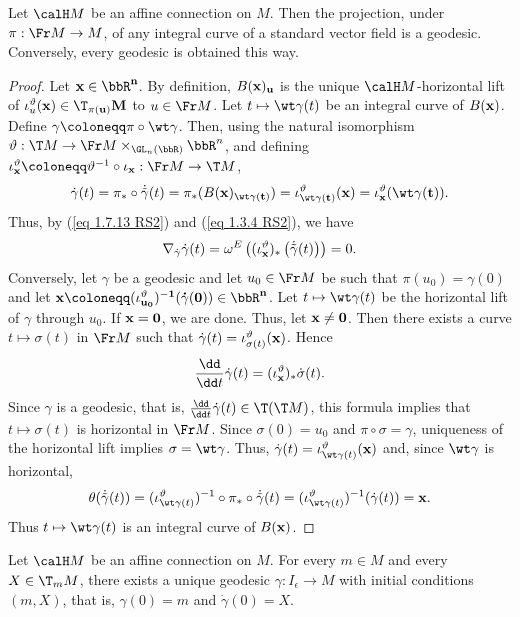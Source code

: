 \begin{prop}[{{\cite[Prop.~2.1.22]{RS2}}}]\label{prop 2.1.22 RS2}
    Let $\calH M$ be an affine connection on $M$. Then the projection, under $\pi:\Fr M\to M$, of any integral curve of a standard vector field is a geodesic. Conversely, every geodesic is obtained this way.
\end{prop}
\begin{proof}
    Let $\bf{x}\in\bbR^n$. By definition, $B(\bf{x})_u$ is the unique $\calH M$-horizontal lift of $\iota_u^\vartheta(\bf{x})\in \T_{\pi(u)}M$ to $u\in\Fr M$. Let $t\mapsto \wt\gamma(t)$ be an integral curve of $B(\bf{x})$. Define $\gamma\coloneqq \pi\circ\wt\gamma$. Then, using the natural isomorphism $\vartheta:\T M\to \Fr M\times_{\GL_n(\bbR)}\bbR^n$, and defining $\iota_{\bf{x}}^\vartheta\coloneqq \vartheta^{-1}\circ\iota_{\bf{x}}:\Fr M\to \T M$,
    \[\dot\gamma(t)=\pi_\ast\circ \dot{\tilde\gamma}(t)=\pi_\ast(B(\bf{x})_{\wt\gamma(t)})=\iota_{\wt\gamma(t)}^\vartheta(\bf{x})=\iota_{\bf{x}}^\vartheta(\wt\gamma(t)).\]
    Thus, by (\ref{eq 1.7.13 RS2}) and (\ref{eq 1.3.4 RS2}), we have 
    \[\nabla_{\dot\gamma}\dot\gamma(t)=\omega^E\left((\iota_{\bf{x}}^\vartheta)_\ast \left(\dot{\tilde\gamma}(t)\right)\right)=0.\]
    Conversely, let $\gamma$ be a geodesic and let $u_0\in\Fr M$ be such that $\pi(u_0)=\gamma(0)$ and let $\bf{x}\coloneqq (\iota_{u_0}^\vartheta)^{-1}(\dot\gamma(0))\in\bbR^n$. Let $t\mapsto \wt\gamma(t)$ be the horizontal lift of $\gamma$ through $u_0$. If $\bf{x}=0$, we are done. Thus, let $\bf{x}\neq 0$. Then there exists a curve $t\mapsto \sigma(t)$ in $\Fr M$ such that $\dot\gamma(t)=\iota_{\sigma(t)}^\vartheta(\bf{x})$. Hence 
    \[\frac{\dd}{\dd t}\dot\gamma(t)=(\iota^\vartheta_{\bf{x}})_\ast\dot\sigma(t).\] 
    Since $\gamma$ is a geodesic, that is, $\frac{\dd}{\dd t}\dot\gamma(t)\in \T(\T M)$, this formula implies that $t\mapsto \sigma(t)$ is horizontal in $\Fr M$. Since $\sigma(0)=u_0$ and $\pi\circ \sigma=\gamma$, uniqueness of the horizontal lift implies $\sigma=\wt\gamma$. Thus, $\dot\gamma(t)=\iota_{\wt\gamma(t)}^\vartheta(\bf{x})$ and, since $\wt\gamma$ is horizontal,
    \[\theta(\dot{\tilde\gamma}(t))=(\iota_{\wt\gamma(t)}^\vartheta)^{-1}\circ\pi_\ast\circ\dot{\tilde\gamma}(t)=
    (\iota_{\wt\gamma(t)}^\vartheta)^{-1}(\dot\gamma(t))=\bf{x}.\]
    Thus $t\mapsto \wt\gamma(t)$ is an integral curve of $B(\bf{x})$.
\end{proof}

\begin{cor}[{{\cite[Cor.~2.1.23]{RS2}}}]\label{cor 2.1.23 RS2}
    Let $\calH M$ be an affine connection on $M$. For every $m\in M$ and every $X\in \T_mM$, there exists a unique geodesic $\gamma:I_\epsilon\to M$ with initial conditions $(m,X)$, that is, $\gamma(0)=m$ and $\dot\gamma(0)=X$.
\end{cor}

